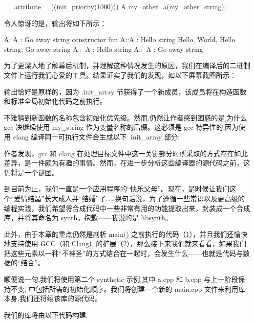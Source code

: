 \begin{cpp}
__attribute__((init_priority(1000)))
A my_other_a(my_other_string);
\end{cpp}

令人惊讶的是，输出将如下所示：

\begin{shell}
A::A : Go away string
constructor fun
A::A : Hello string
Hello, World, Hello string, Go away string
A::~A : Hello string
A::~A : Go away string
\end{shell}

为了更深入地了解幕后机制，并理解这种情况发生的原因，我们在编译后的二进制文件上运行我们心爱的工具。结果证实了我们的发现，如以下屏幕截图所示：


输出恰好是原样的，因为 .init\_array 节获得了一个新成员，该成员将在构造函数和标准全局初始化代码之前执行。

不难猜到新函数的名称包含初始化优先级。然而,仍然让作者感到困惑的是,为什么 gcc 决继续使用 my\_string 作为变量名称的后缀。这必须是 gcc 特异性的,因为使用 clang 编译同一可执行文件会生成以下 .init\_array 部分:


作者发现，gcc 和 clang 在处理目标文件中这一关键部分时所采取的方式存在如此差异，是一件颇为有趣的事情。然而，在进一步分析这些编译器的源代码之前，这仍将是一个谜团。


到目前为止，我们一直是一个应用程序的“快乐父母”。现在，是时候让我们这个“爱情结晶”长大成人并“结婚”了……换句话说，为了遵循一些常识以及更高级的编程实践，我们希望将合成代码中一些非常有用的功能提取出来，封装成一个合成库，并将其命名为 synth。抱歉——我说的是 libsynth。

此外，由于本章的重点仍然是剖析 main() 之前执行的代码（1），并且我们还愉快地支持使用 GCC（和 Clang）的扩展（2），那么接下来我们就来看看，如果我们把这些元素以一种“不神圣”的方式结合在一起时，会发生什么——也就是代码与数据的“结合”。

顺便说一句,我们将使用第二个 synthetic 示例,其中 a.cpp 和 b.cpp 与上一阶段保持不变, 中包括所需的初始化顺序。我们将创建一个新的 main.cpp 文件来利用库本身,我们还将绍该库的源代码。

我们的库将由以下代码构建:


